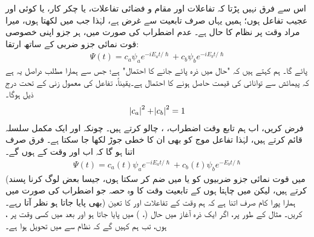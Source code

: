 اس سے فرق نہیں پڑتا کہ تفاعلات  اور  مقام و  فضائی تفاعلات،  یا چکر کار،  یا کوئی اور عجیب تفاعل ہوں؛ ہمیں یہاں صرف تابعیت    سے غرض ہے،  لہٰذا جب  میں  لکھتا ہوں،  میرا مراد وقت  پر نظام کا حال ہے۔ عدم اضطراب کی صورت میں،  ہر جزو  اپنی خصوصی قوت نمائی جزو  ضربی  کے ساتھ ارتقا:
\begin{align}
	\Psi(t)=c_a\psi_ae^{-iE_at/\hslash}+c_b\psi_be^{-iE_bt/\hslash}
\end{align}
پائے گا۔ ہم کہتے ہیں کہ "حال  میں ذرہ پائے جانے کا احتمال"   ہے؛ جس سے ہمارا   مطلب دراصل  یہ ہے کہ پیمائش سے  توانائی کی قیمت   حاصل ہونے کا احتمال  ہے۔یقیناً،  تفاعل  کی معمول زنی کے تحت درج ذیل ہوگا۔
\begin{align}\label{مساوات_تابع_مضطرب_معمول_زنی}
	\abs{c_a}^2+\abs{c_b}^2=1
\end{align}
 فرض کریں، اب  ہم تابع وقت اضطراب،  ،  چالو کرتے ہیں۔ چونکہ  اور  ایک مکمل سلسلہ  قائم   کرتے ہیں، لہٰذا تفاعل موج  کو بھی ان کا خطی جوڑ لکھا جا سکتا ہے۔ فرق صرف اتنا ہو گا کہ اب  اور  وقت  کے   ہوں گے۔
\begin{align}\label{مساوات_تابع_مضطرب_وقت}
	\Psi(t)=c_a(t)\psi_ae^{-iE_at/\hslash}+c_b(t)\psi_be^{-E_bt/\hslash}
\end{align}
(میں قوت نمائی  جزو  ضربیوں کو  یا  میں ضم کر سکتا ہوں، جیسا  بعض  لوگ کرنا پسند کرتے ہیں، لیکن میں چاہتا ہوں کے تابعیت وقت کا وہ حصہ جو   اضطراب کی   صورت میں بھی پایا جاتا ہو نظر آتا رہے۔)  ہمارا پورا کام صرف اتنا ہے کہ ہم وقت کے تفاعلات  اور  کا  تعین کریں۔ مثال کے طور پر،  اگر ایک ذرہ آغاز میں حال  
(، )  میں پایا جاتا ہو اور بعد میں کسی وقت  پر  ،  ہوں،  تب ہم کہیں گے کہ نظام  سے  میں  تحویل  ہوا ہے۔

